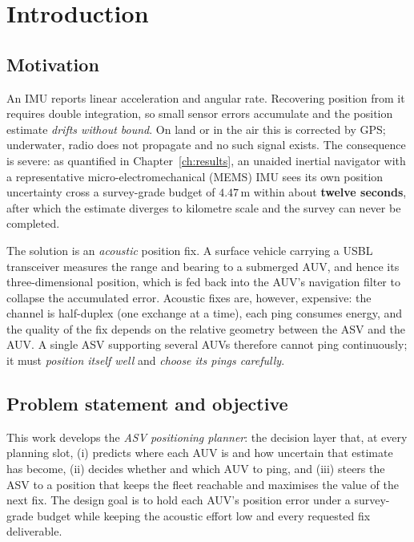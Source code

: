 \documentclass[12pt,a4paper,oneside]{book}
\newcommand{\chapref}[1]{Chapter~\ref{#1}}
\begin{document}
\chapter{Introduction}
\label{ch:intro}

\section{Motivation}
An IMU reports linear acceleration and angular rate. Recovering position from it requires double
integration, so small sensor errors accumulate and the position estimate \emph{drifts without bound}. On
land or in the air this is corrected by GPS; underwater, radio does not propagate and no such signal
exists. The consequence is severe: as quantified in \chapref{ch:results}, an unaided inertial navigator
with a representative micro-electromechanical (MEMS) IMU sees its own position uncertainty cross a
survey-grade budget of $4.47$\,m within about \textbf{twelve seconds}, after which the estimate diverges to
kilometre scale and the survey can never be completed.

The solution is an \emph{acoustic} position fix. A surface vehicle carrying a USBL transceiver measures the
range and bearing to a submerged AUV, and hence its three-dimensional position, which is fed back into the
AUV's navigation filter to collapse the accumulated error. Acoustic fixes are, however, expensive: the
channel is half-duplex (one exchange at a time), each ping consumes energy, and the quality of the fix
depends on the relative geometry between the ASV and the AUV. A single ASV supporting several AUVs therefore
cannot ping continuously; it must \emph{position itself well} and \emph{choose its pings carefully}.

\section{Problem statement and objective}
This work develops the \emph{ASV positioning planner}: the decision layer that, at every planning slot,
(i) predicts where each AUV is and how uncertain that estimate has become, (ii) decides whether and which
AUV to ping, and (iii) steers the ASV to a position that keeps the fleet reachable and maximises the value
of the next fix. The design goal is to hold each AUV's position error under a survey-grade budget while
keeping the acoustic effort low and every requested fix deliverable.
\end{document}
